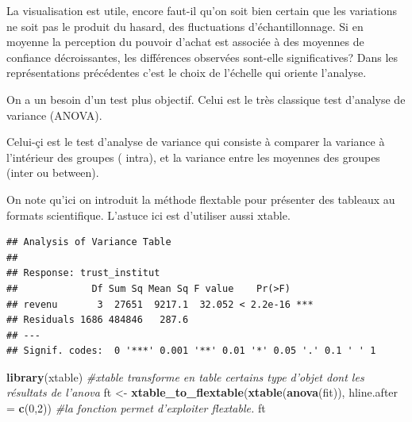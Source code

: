 \documentclass[
]{book}
\newenvironment{Shaded}{\begin{snugshade}}{\end{snugshade}}
\newcommand{\CommentTok}[1]{\textcolor[rgb]{0.56,0.35,0.01}{\textit{#1}}}
\newcommand{\DataTypeTok}[1]{\textcolor[rgb]{0.13,0.29,0.53}{#1}}
\newcommand{\DecValTok}[1]{\textcolor[rgb]{0.00,0.00,0.81}{#1}}
\newcommand{\KeywordTok}[1]{\textcolor[rgb]{0.13,0.29,0.53}{\textbf{#1}}}
\newcommand{\NormalTok}[1]{#1}
\newcommand{\OperatorTok}[1]{\textcolor[rgb]{0.81,0.36,0.00}{\textbf{#1}}}
\newcommand{\StringTok}[1]{\textcolor[rgb]{0.31,0.60,0.02}{#1}}
\begin{document}
La visualisation est utile, encore faut-il qu'on soit bien certain que les variations ne soit pas le produit du hasard, des fluctuations d'échantillonnage. Si en moyenne la perception du pouvoir d'achat est associée à des moyennes de confiance décroissantes, les différences observées sont-elle significatives? Dans les représentations précédentes c'est le choix de l'échelle qui oriente l'analyse.

On a un besoin d'un test plus objectif. Celui est le très classique test d'analyse de variance (ANOVA).

Celui-çi est le test d'analyse de variance qui consiste à comparer la variance à l'intérieur des groupes ( intra), et la variance entre les moyennes des groupes (inter ou between).

On note qu'ici on introduit la méthode flextable pour présenter des tableaux au formats scientifique. L'astuce ici est d'utiliser aussi xtable.

\begin{Shaded}
\end{Shaded}

\begin{verbatim}
## Analysis of Variance Table
## 
## Response: trust_institut
##             Df Sum Sq Mean Sq F value    Pr(>F)    
## revenu       3  27651  9217.1  32.052 < 2.2e-16 ***
## Residuals 1686 484846   287.6                      
## ---
## Signif. codes:  0 '***' 0.001 '**' 0.01 '*' 0.05 '.' 0.1 ' ' 1
\end{verbatim}

\begin{Shaded}
\begin{Highlighting}[]
\KeywordTok{library}\NormalTok{(xtable) }\CommentTok{#xtable transforme en table certains type d'objet dont les résultats de l'anova}
\NormalTok{ft <-}\StringTok{ }\KeywordTok{xtable_to_flextable}\NormalTok{(}\KeywordTok{xtable}\NormalTok{(}\KeywordTok{anova}\NormalTok{(fit)), }\DataTypeTok{hline.after =} \KeywordTok{c}\NormalTok{(}\DecValTok{0}\NormalTok{,}\DecValTok{2}\NormalTok{)) }\CommentTok{#la fonction permet d'exploiter flextable.}
\NormalTok{ft}
\end{Highlighting}
\end{Shaded}
\end{document}
